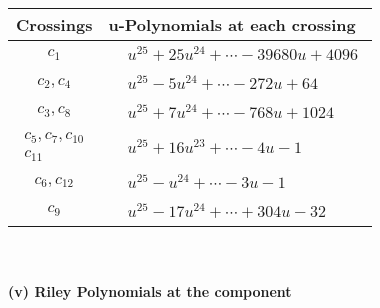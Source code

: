 \documentclass[1p]{elsarticle_modified}
\theoremstyle{definition}
\begin{document}
\begin{tabular}{m{50pt}|m{274pt}}
Crossings & \hspace{64pt}u-Polynomials at each crossing \\
\hline $$\begin{aligned}c_{1}\end{aligned}$$&$\begin{aligned}
&u^{25}+25 u^{24}+\cdots-39680 u+4096
\end{aligned}$\\
\hline $$\begin{aligned}c_{2},c_{4}\end{aligned}$$&$\begin{aligned}
&u^{25}-5 u^{24}+\cdots-272 u+64
\end{aligned}$\\
\hline $$\begin{aligned}c_{3},c_{8}\end{aligned}$$&$\begin{aligned}
&u^{25}+7 u^{24}+\cdots-768 u+1024
\end{aligned}$\\
\hline $$\begin{aligned}c_{5},c_{7},c_{10}\\c_{11}\end{aligned}$$&$\begin{aligned}
&u^{25}+16 u^{23}+\cdots-4 u-1
\end{aligned}$\\
\hline $$\begin{aligned}c_{6},c_{12}\end{aligned}$$&$\begin{aligned}
&u^{25}- u^{24}+\cdots-3 u-1
\end{aligned}$\\
\hline $$\begin{aligned}c_{9}\end{aligned}$$&$\begin{aligned}
&u^{25}-17 u^{24}+\cdots+304 u-32
\end{aligned}$\\
\hline
\end{tabular}\\~\\
\newpage\renewcommand{\arraystretch}{1}
\flushleft \textbf{(v) Riley Polynomials at the component}\newline \\
\end{document}
